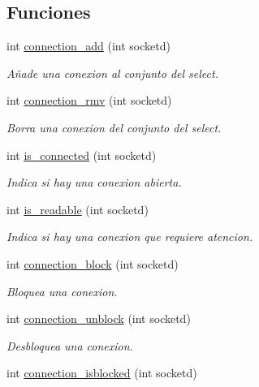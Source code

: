 \subsection*{Funciones}
\begin{DoxyCompactItemize}
\item 
int \hyperlink{G-2301-01-P1-server_8c_a0ea0fc1dac4ab7f138858ad206bf74f9}{connection\+\_\+add} (int socketd)
\begin{DoxyCompactList}\small\item\em Añade una conexion al conjunto del select. \end{DoxyCompactList}\item 
int \hyperlink{G-2301-01-P1-server_8c_a185cd248a82f10518a5e7064e7e328d6}{connection\+\_\+rmv} (int socketd)
\begin{DoxyCompactList}\small\item\em Borra una conexion del conjunto del select. \end{DoxyCompactList}\item 
int \hyperlink{G-2301-01-P1-server_8c_a450fc862cf1803d838128521627d0f11}{is\+\_\+connected} (int socketd)
\begin{DoxyCompactList}\small\item\em Indica si hay una conexion abierta. \end{DoxyCompactList}\item 
int \hyperlink{G-2301-01-P1-server_8c_a871f4cd038820ee57fd76721d5ccc7c7}{is\+\_\+readable} (int socketd)
\begin{DoxyCompactList}\small\item\em Indica si hay una conexion que requiere atencion. \end{DoxyCompactList}\item 
int \hyperlink{G-2301-01-P1-server_8c_ad1d153d3ac0e96e2186ebc2be9214ab3}{connection\+\_\+block} (int socketd)
\begin{DoxyCompactList}\small\item\em Bloquea una conexion. \end{DoxyCompactList}\item 
int \hyperlink{G-2301-01-P1-server_8c_a6606674ddfef06318569d8c8cab9bdd5}{connection\+\_\+unblock} (int socketd)
\begin{DoxyCompactList}\small\item\em Desbloquea una conexion. \end{DoxyCompactList}\item 
int \hyperlink{G-2301-01-P1-server_8c_a75bd7c31947615086b494f220e733e83}{connection\+\_\+isblocked} (int socketd)

\end{DoxyCompactItemize}
